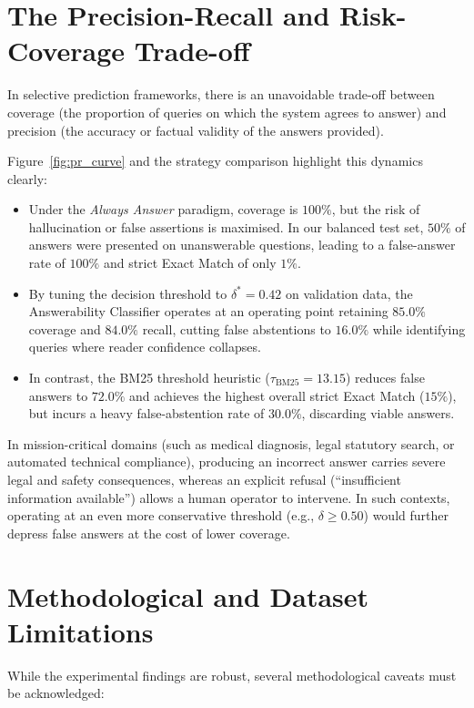 \section{The Precision-Recall and Risk-Coverage Trade-off}
\label{sec:disc_tradeoff}

In selective prediction frameworks, there is an unavoidable trade-off between coverage (the proportion of queries on which the system agrees to answer) and precision (the accuracy or factual validity of the answers provided).

Figure~\ref{fig:pr_curve} and the strategy comparison highlight this dynamics clearly:
\begin{itemize}
  \item Under the \emph{Always Answer} paradigm, coverage is $100\%$, but the risk of hallucination or false assertions is maximised. In our balanced test set, $50\%$ of answers were presented on unanswerable questions, leading to a false-answer rate of $100\%$ and strict Exact Match of only $1\%$.
  \item By tuning the decision threshold to $\delta^* = 0.42$ on validation data, the Answerability Classifier operates at an operating point retaining $85.0\%$ coverage and $84.0\%$ recall, cutting false abstentions to $16.0\%$ while identifying queries where reader confidence collapses.
  \item In contrast, the BM25 threshold heuristic ($\tau_{\text{BM25}} = 13.15$) reduces false answers to $72.0\%$ and achieves the highest overall strict Exact Match ($15\%$), but incurs a heavy false-abstention rate of $30.0\%$, discarding viable answers.
\end{itemize}

In mission-critical domains (such as medical diagnosis, legal statutory search, or automated technical compliance), producing an incorrect answer carries severe legal and safety consequences, whereas an explicit refusal (``insufficient information available'') allows a human operator to intervene. In such contexts, operating at an even more conservative threshold (e.g., $\delta \ge 0.50$) would further depress false answers at the cost of lower coverage.

\section{Methodological and Dataset Limitations}
\label{sec:disc_limitations}

While the experimental findings are robust, several methodological caveats must be acknowledged:

